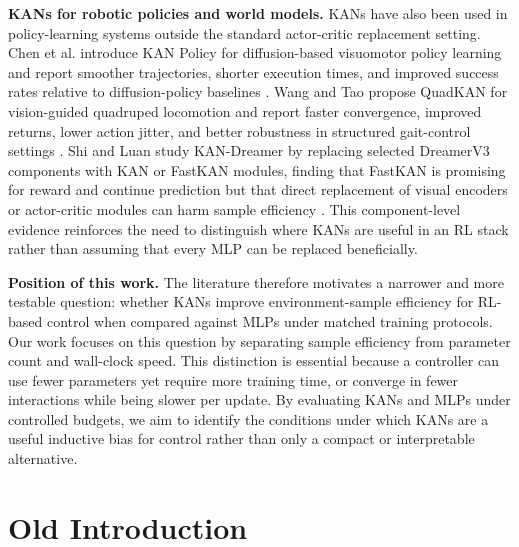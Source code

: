 \documentclass{article}
\begin{document}
\textbf{KANs for robotic policies and world models.}
KANs have also been used in policy-learning systems outside the standard actor-critic replacement setting.
Chen et al. introduce KAN Policy for diffusion-based visuomotor policy learning and report smoother trajectories, shorter execution times, and improved success rates relative to diffusion-policy baselines \cite{chen2025kanpolicy}.
Wang and Tao propose QuadKAN for vision-guided quadruped locomotion and report faster convergence, improved returns, lower action jitter, and better robustness in structured gait-control settings \cite{wang2025quadkan}.
Shi and Luan study KAN-Dreamer by replacing selected DreamerV3 components with KAN or FastKAN modules, finding that FastKAN is promising for reward and continue prediction but that direct replacement of visual encoders or actor-critic modules can harm sample efficiency \cite{shi2025kandreamer}.
This component-level evidence reinforces the need to distinguish where KANs are useful in an RL stack rather than assuming that every MLP can be replaced beneficially.

\textbf{Position of this work.}
The literature therefore motivates a narrower and more testable question: whether KANs improve environment-sample efficiency for RL-based control when compared against MLPs under matched training protocols.
Our work focuses on this question by separating sample efficiency from parameter count and wall-clock speed.
This distinction is essential because a controller can use fewer parameters yet require more training time, or converge in fewer interactions while being slower per update.
By evaluating KANs and MLPs under controlled budgets, we aim to identify the conditions under which KANs are a useful inductive bias for control rather than only a compact or interpretable alternative.

\iffalse
\section{Old Introduction}
\end{document}
